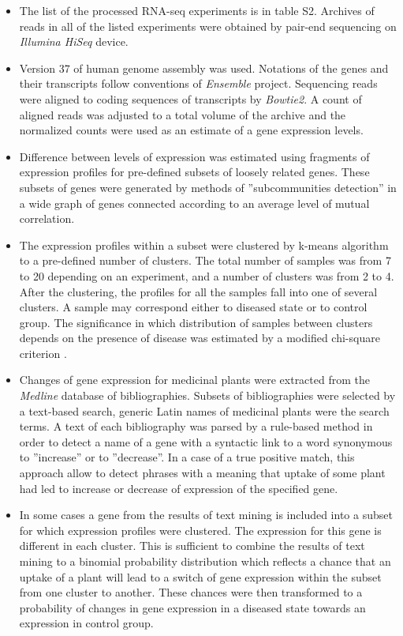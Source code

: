 \documentclass[12pt,aps]{revtex4}
\begin{document}
\begin{itemize}

\item 
The list of the processed RNA-seq experiments is in table S2. Archives of reads in all of the listed experiments were obtained by pair-end sequencing on \textit{Illumina HiSeq} device.  

\item
Version 37 of human genome assembly was used. Notations of the genes and their transcripts follow conventions of \textit{Ensemble} project. Sequencing reads were aligned to coding sequences of transcripts by \textit{Bowtie2}. A count of aligned reads was adjusted to a total volume of the archive and the normalized counts were used as an estimate of a gene expression levels.

\item
Difference between levels of expression was estimated using fragments of expression profiles for pre-defined subsets of loosely related genes. These subsets of genes were generated by methods of ''subcommunities detection'' in a wide graph of genes connected according to an average level of mutual correlation.

\item
The expression profiles within a subset were clustered by k-means algorithm to a pre-defined number of clusters. The total number of samples was from 7 to 20 depending on an experiment, and a number of clusters was from 2 to 4. After the clustering, the profiles for all the samples fall into one of several clusters. A sample may correspond either to diseased state or to control group. The significance in which distribution of samples between clusters depends on the presence of disease was estimated by a modified chi-square criterion \cite{CS1}. 

\item
Changes of gene expression for medicinal plants were extracted from the \textit{Medline} database of bibliographies. Subsets of bibliographies were selected by a text-based search, generic Latin names of medicinal plants were the search terms. A text of each bibliography was parsed by a rule-based method in order to detect a name of a gene with a syntactic link to a word synonymous to ''increase'' or to ''decrease''. In a case of a true positive match, this approach allow to detect phrases with a meaning that uptake of some plant had led to increase or decrease of expression of the specified gene.

\item 
In some cases a gene from the results of text mining is included into a subset for which expression profiles were clustered. The expression for this gene is different in each cluster. This is sufficient to combine the results of text mining to a binomial probability distribution which reflects a chance that an uptake of a plant will lead to a switch of gene expression within the subset from one cluster to another. These chances were then transformed to a probability of changes in gene expression in a diseased state towards an expression in control group. 


\end{itemize}
\end{document}
